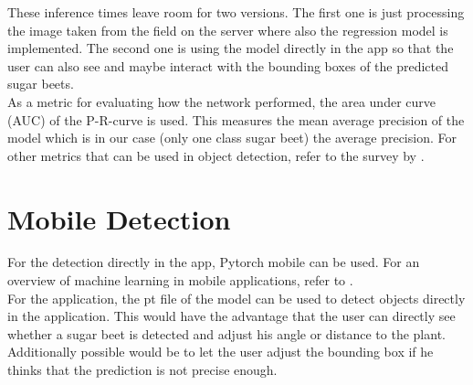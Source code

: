 These inference times leave room for two versions. The first one is just processing the image taken from the field on the server where also the regression model is implemented. The second one is using the model directly in the app so that the user can also see and maybe interact with the bounding boxes of the predicted sugar beets. \\

As a metric for evaluating how the network performed, the area under curve (AUC) of the P-R-curve is used. This measures the mean average precision of the model which is in our case (only one class sugar beet) the average precision. For other metrics that can be used in object detection, refer to the survey by \cite{metrics_survey}.

\section{Mobile Detection}
For the detection directly in the app, Pytorch mobile \cite{pytorch_mobile} can be used. For an overview of machine learning in mobile applications, refer to \cite{survey_machine_learning_mobile}. \\

For the application, the pt file of the model can be used to detect objects directly in the application. This would have the advantage that the user can directly see whether a sugar beet is detected and adjust his angle or distance to the plant. Additionally possible would be to let the user adjust the bounding box if he thinks that the prediction is not precise enough. 


